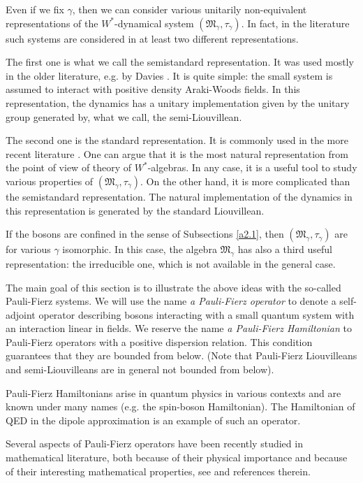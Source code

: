 \documentclass{svmult}
\def\PF{{}}
\def\fM{{\mathfrak M}}
\begin{document}
Even if we fix $\gamma$, then we can consider various unitarily non-equivalent
 representations of the $W^*$-dynamical system  $(\fM_\gamma^\PF,\tau_\gamma)$. In
 fact, 
 in the literature such
 systems are considered in at least  two
different representations.

 The first one is what we call
 the semistandard
representation. It was used mostly in the older literature, e.g. 
 by Davies \cite{Da}. It
is quite simple: the small system is assumed to interact with positive
density Araki-Woods fields. In this representation, the dynamics 
 has a unitary implementation given  by the unitary group
generated
 by, what we call,
the
 semi-Liouvillean.

 The second one  is the standard
representation. It is commonly used
 in the more recent literature \cite{DJ2,BFS}. One can argue that
it is the most natural representation from the point of view of theory of
$W^*$-algebras. In any case, it is a useful tool to study various properties
of $(\fM_\gamma^\PF,\tau_\gamma)$.
 On the other hand, it is more complicated than the
semistandard representation. 
The natural implementation of the dynamics
in this representation  is
generated by the
standard Liouvillean.


If the bosons are confined
in the sense of
Subsections \ref{a2.1}, then   $(\fM_\gamma^\PF,\tau_\gamma)$
 are for various $\gamma$
isomorphic. In this case, the algebra $\fM_\gamma^\PF$ has  also a third useful
representation: the 
 irreducible one, which is not available in the
general case.

The 
 main goal of this section is to illustrate the above 
 ideas with the
 so-called  Pauli-Fierz systems.
We will
 use the name {\em
a Pauli-Fierz operator} to denote a self-adjoint operator
describing bosons interacting with
 a small quantum system with an interaction
linear in fields. 
We 
reserve the name {\em a Pauli-Fierz  Hamiltonian} to 
Pauli-Fierz operators with a
positive dispersion relation. This condition guarantees that they are bounded
 from below.
(Note that Pauli-Fierz
 Liouvilleans and semi-Liouvilleans are in general
 not bounded from below).


Pauli-Fierz Hamiltonians 
 arise in  quantum physics in various contexts
and are known under many names (e.g. the spin-boson Hamiltonian).  
The Hamiltonian
of QED in the dipole approximation is an example of such an operator.





Several aspects of
 Pauli-Fierz operators have
been recently 
studied in mathematical literature, both because of their physical
importance and because of their interesting mathematical properties, see
\cite{DG,DJ,DJ2,BFS} and references therein. 
\end{document}
